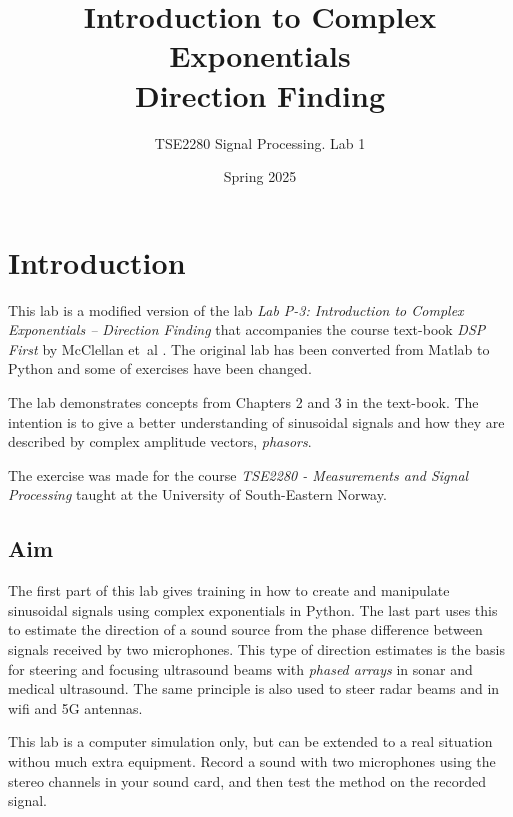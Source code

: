 
\newcommand{\numpy}{NumPy\xspace}
\newcommand{\matplotlib}{Matplotlib\xspace}
\newcommand{\scipy}{SciPy\xspace}
\newcommand{\cmath}{cmath\xspace}
\newcommand{\jupyterlab}{JupyterLab\xspace}


\logo

\title{Introduction to Complex Exponentials \\ Direction Finding} 
\author{TSE2280 Signal Processing. Lab 1}
\date{Spring 2025}
\maketitle

\thispagestyle{fancy}	

\section{Introduction}
\suppressfloats[t]
This lab is a modified version of the lab \emph{Lab P-3: Introduction to Complex Exponentials – Direction Finding}\cite{mcclellan_lab_2016} that accompanies the course text-book \emph{DSP First} by McClellan et~al \cite{mcclellan_dsp_2016}. The original lab has been converted from Matlab to Python and some of exercises have been changed. 

The lab demonstrates concepts from Chapters 2 and 3 in the text-book. The intention is to give a better understanding of sinusoidal signals and how they are described by complex amplitude vectors, \emph{phasors}.

The exercise was made for the course \emph{TSE2280 - Measurements and Signal Processing} taught at the University of South-Eastern Norway.

\subsection{Aim}
The first part of this lab gives training in how to create and manipulate sinusoidal signals using complex exponentials in Python. The last part uses this to estimate the direction of a sound source from the phase difference between signals received by two microphones. 
This type of direction estimates is the basis for steering and focusing ultrasound beams with \emph{phased arrays} in sonar and medical ultrasound. The same principle is also used to steer radar beams and in wifi and 5G antennas.

This lab is a computer simulation only, but can be extended to a real situation withou much extra equipment. Record a sound with two microphones using the stereo channels in your sound card, and then test the method on the recorded signal.


